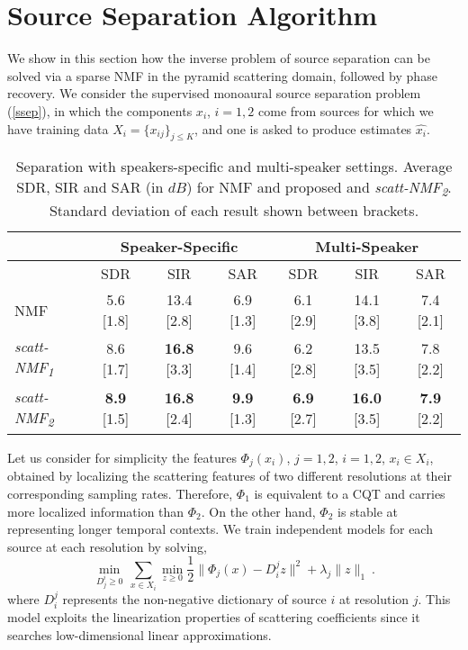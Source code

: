\section{Source Separation Algorithm}
\label{algosec}
We show in this section how the inverse problem of source separation 
can be solved via a sparse NMF in the pyramid scattering domain, followed by phase recovery.
We consider the supervised 
monoaural source separation problem (\ref{ssep}), 
 in which the components $x_i$, $i=1,2$ come from sources for 
 which we have training data $X_i=\{x_{ij}\}_{j \leq K}$, 
and one is asked to produce estimates $\widehat{x_i}$. 

\begin{table*}[t]
\centering
\begin{tabular}{l|c|c|c || c |c |c }
  \hline\hline
  & \multicolumn{3}{c||}{Speaker-Specific} & \multicolumn{3}{c}{Multi-Speaker} \\
  \hline
 & SDR & SIR & SAR & SDR & SIR & SAR\\
\hline
NMF  & 5.6 [1.8] & 13.4 [2.8] &   6.9 [1.3] & 6.1 [2.9] &   14.1 [3.8] & 7.4 [2.1] \\
\hline
\emph{scatt-NMF\textsubscript{1}} & 8.6 [1.7]  & {\bf 16.8} [3.3]  & 9.6 [1.4] &  6.2 [2.8] &   13.5 [3.5] & 7.8 [2.2] \\
\emph{scatt-NMF\textsubscript{2}} &  {\bf 8.9} [1.5] & {\bf 16.8} [2.4]  & {\bf 9.9} [1.3]  &  {\bf 6.9} [2.7] & {\bf 16.0} [3.5]  & {\bf 7.9} [2.2] \\
  \hline
  \hline
\end{tabular}
\caption{Separation with speakers-specific and multi-speaker settings. Average SDR, SIR and SAR (in $dB$) for NMF and proposed  and \emph{scatt-NMF\textsubscript{2}}. Standard deviation of each result shown between brackets. \label{ta:eval}}
\end{table*}

Let us consider for simplicity the features $\Phi_j(x_i)$, $j=1,2$, $i=1,2$, $x_i \in X_i$, obtained by localizing the scattering features of two different resolutions at their 
corresponding sampling rates. Therefore, $\Phi_1$ is equivalent to a CQT and carries more localized information than $\Phi_2$. 
On the other hand, $\Phi_2$ is stable at representing longer temporal contexts. We train independent models for each source at each resolution by solving,
\begin{equation}
\min_{D^i_j \geq 0} \, \sum_{x\in X_i}   \min_{z \geq 0}  \frac{1}{2}  \| \Phi_j(x) - D^j_i z \|^2 + \lambda_j \| z \|_1~.
\nonumber
\end{equation}
where $D^j_i$ represents the non-negative dictionary of source $i$ at resolution $j$. 
This model exploits the linearization properties of scattering coefficients since it 
searches low-dimensional linear approximations. 

